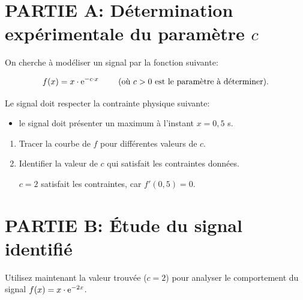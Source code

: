 \documentclass[11pt, a4paper]{report}
\begin{document}
\def\level{BTS}  %
\def\course{CIEL 1}
\def\chaptername{Intégration} %
\def\docname{C107~--~TP3}        %

\pagestyle{DS_FP}

\NomPrenomNote{}

\section*{PARTIE A\@: Détermination expérimentale du paramètre $c$}

On cherche à modéliser un signal par la fonction suivante: 

\[f(x) =  x\cdot\mathrm{e}^{-c\cdot x} \qquad \text{ (où $c>0$ est le paramètre à déterminer).}\]

Le signal doit respecter la contrainte physique suivante:

\begin{itemize}
    \item le signal doit présenter un maximum à l'instant $x=0,5$ s.
\end{itemize}

\begin{enumerate}
    \item Tracer la courbe de $f$ pour différentes valeurs de $c$. 
    \item Identifier la valeur de $c$ qui satisfait les contraintes données. 
     \begin{blocvisible}[height=1]
        $c = 2$ satisfait les contraintes, car $f'(0,5) = 0$.
    \end{blocvisible}
\end{enumerate}


\section*{PARTIE B\@: Étude du signal identifié}

Utilisez maintenant la valeur trouvée ($c = 2$) pour analyser le comportement du signal $f(x) = x \cdot\mathrm{e}^{-2x}$.
\end{document}
